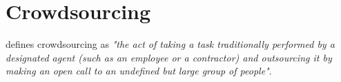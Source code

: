 \section{Crowdsourcing}
\label{chp:fundamentals:sec:crowdsourcing}

\textcite{Howe:2008} defines crowdsourcing as \textit{"the act of taking a task traditionally performed by a designated agent (such as an employee or a contractor) and outsourcing it by making an open call to an undefined but large group of people"}.
